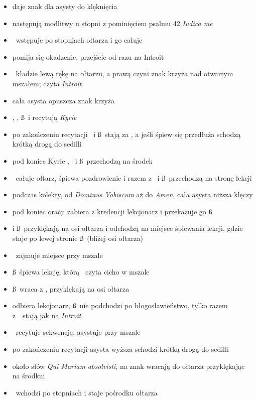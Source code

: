 \begin{itemize}
	\item  {} daje znak dla asysty do klęknięcia
	\item następują modlitwy u stopni z pominięciem psalmu 42 \textit{Iudica me}
	\item \ii~wstępuje po stopniach ołtarza i go całuje
	\item pomija się okadzenie, przejście od razu na Introit
	\item \ii~kładzie lewą rękę na ołtarzu, a prawą czyni znak krzyża nad
		otwartym mszałem; czyta \textit{Introit}
	\item cała asysta opuszcza znak krzyża
	\item \ii, \dd, \ss~i  recytują \textit{Kyrie}	
	\item po zakończeniu recytacji \dd~i \ss~stają za \ii, a jeśli śpiew się
		przedłuża schodzą krótką drogą do sedilli
	\item pod koniec Kyrie \ii, \dd~i \ss~przechodzą na środek
	\item \ii~całuje ołtarz, śpiewa pozdrowienie i razem z \dd~i \ss~przechodzą
		na stronę lekcji
	\item podczas kolekty, od \textit{Dominus Vobiscum} aż do
		\textit{Amen}, cała asysta niższa klęczy
	\item pod koniec oracji  zabiera z kredencji lekcjonarz i przekazuje
		go \ss
	\item {} i \ss~przyklękają na osi ołtarza i odchodzą na miejsce śpiewania
		lekcji, gdzie  staje po lewej stronie \ss~(bliżej osi ołtarza)
	\item \dd~zajmuje miejsce przy mszale
	\item \ss~śpiewa lekcję, którą \ii~czyta cicho w mszale
	\item \ss~wraca z , przyklękają na osi ołtarza
	\item {} odbiera lekcjonarz, \ss~nie podchodzi po błogosławieństwo, tylko
		razem z \dd~stają jak na \textit{Introit}
	\item \ii~recytuje sekwencję,  asystuje przy mszale
	\item po zakończeniu recytacji asysta wyższa schodzi krótką drogą do
		sedilli
	\item około słów \textit{Qui Mariam absolvisti}, na znak  wracają do ołtarza
		przyklękając na środkui
	\item \ii~wchodzi po stopniach i staje pośrodku ołtarza
\end{itemize}

